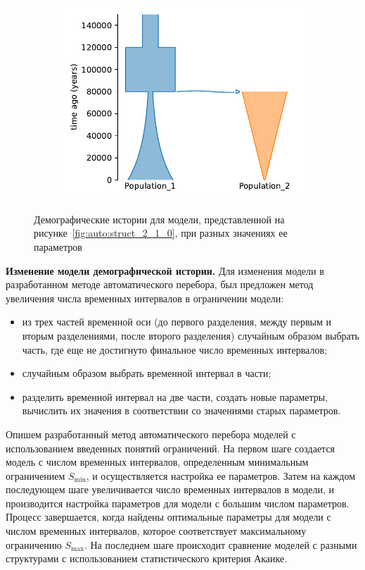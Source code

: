 \begin{figure}[ht]
\begin{subfigure}[c]{.32\textwidth}
    \includegraphics[width=\textwidth]{images_2/picture_2pops_str_4.pdf}
    \caption{}
    \label{fig:auto:struct_2_1_0_ex_3}
    \end{subfigure}
    \caption{Демографические истории для модели, представленной на рисунке~\ref{fig:auto:struct_2_1_0}, при разных значениях ее параметров}
    \label{fig:auto:struct_2_1_0_ex}
\end{figure}

\FloatBarrier
\textbf{Изменение модели демографической истории.}
Для изменения модели в разработанном методе автоматического перебора, был предложен метод увеличения числа временных интервалов в ограничении модели:
\begin{itemize}
    \item из трех частей временной оси (до первого разделения, между первым и вторым разделениями, после второго разделения) случайным образом выбрать часть, где еще не достигнуто финальное число временных интервалов;
    \item случайным образом выбрать временной интервал в части;
    \item разделить временной интервал на две части, создать новые параметры, вычислить их значения в соответствии со значениями старых параметров.
\end{itemize}

Опишем разработанный метод автоматического перебора моделей с использованием введенных понятий ограничений.
На первом шаге создается модель с числом временных интервалов, определенным минимальным ограничением $S_{\min}$, и осуществляется настройка ее параметров.
Затем на каждом последующем шаге увеличивается число временных интервалов в модели, и производится настройка параметров для модели с большим числом параметров.
Процесс завершается, когда найдены оптимальные параметры для модели с числом временных интервалов, которое соответствует максимальному ограничению $S_{\max}$.
На последнем шаге происходит сравнение моделей с разными структурами с использованием статистического критерия Акаике.\\

